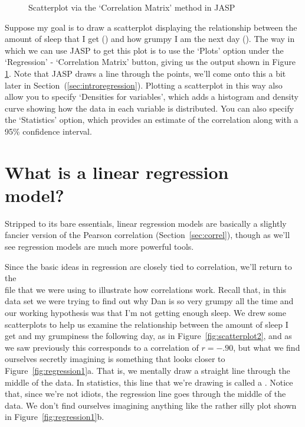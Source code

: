 \begin{figure}[!htb]
\begin{center}
\caption{Scatterplot via the `Correlation Matrix' method in JASP}
\label{fig:scatterplot1}
\HR
\end{center}
\end{figure}

Suppose my goal is to draw a scatterplot displaying the relationship between the amount of sleep that I get () and how grumpy I am the next day (). The way in which we can use JASP to get this plot is to use the `Plots' option under the `Regression' - `Correlation Matrix' button, giving us the output shown in Figure \ref{fig:scatterplot1}. Note that JASP draws a line through the points, we'll come onto this a bit later in Section~(\ref{sec:introregression}). Plotting a scatterplot in this way also allow you to specify `Densities for variables', which adds a histogram and density curve showing how the data in each variable is distributed. You can also specify the `Statistics' option, which provides an estimate of the correlation along with a 95\% confidence interval.

\section{What is a linear regression model?~\label{sec:introregression}}

Stripped to its bare essentials, linear regression models are basically a slightly fancier version of the Pearson correlation (Section~\ref{sec:correl}), though as we'll see regression models are much more powerful tools. 

Since the basic ideas in regression are closely tied to correlation, we'll return to the \\  file that we were using to illustrate how correlations work. Recall that, in this data set we were trying to find out why Dan is so very grumpy all the time and our working hypothesis was that I'm not getting enough sleep. We drew some scatterplots to help us examine the relationship between the amount of sleep I get and my grumpiness the following day, as in Figure~\ref{fig:scatterplot2}, and as we saw previously this corresponds to a correlation of $r=-.90$, but what we find ourselves secretly imagining is something that looks closer to Figure~\ref{fig:regression1}a. That is, we mentally draw a straight line through the middle of the data. In statistics, this line that we're drawing is called a . Notice that, since we're not idiots, the regression line goes through the middle of the data. We don't find ourselves imagining anything like the rather silly plot shown in Figure~\ref{fig:regression1}b. 

